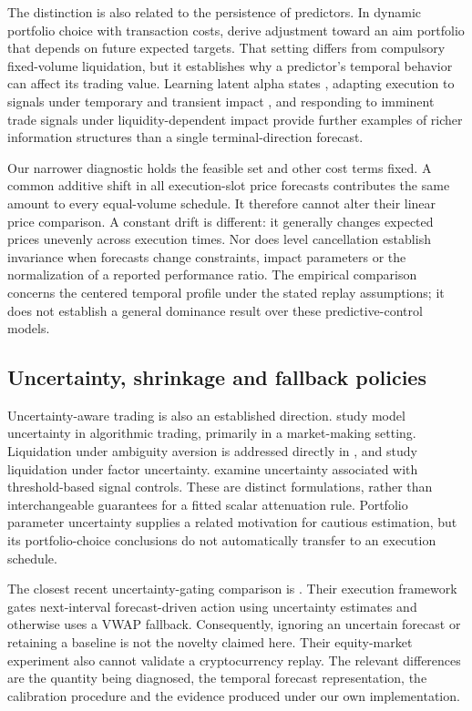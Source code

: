 The distinction is also related to the persistence of predictors. In dynamic portfolio choice with transaction costs, \citet{garleanu2013} derive adjustment toward an aim portfolio that depends on future expected targets. That setting differs from compulsory fixed-volume liquidation, but it establishes why a predictor's temporal behavior can affect its trading value. Learning latent alpha states \citep{casgrain2019}, adapting execution to signals under temporary and transient impact \citep{neuman2022}, and responding to imminent trade signals under liquidity-dependent impact \citep{bank2026} provide further examples of richer information structures than a single terminal-direction forecast.

Our narrower diagnostic holds the feasible set and other cost terms fixed. A common additive shift in all execution-slot price forecasts contributes the same amount to every equal-volume schedule. It therefore cannot alter their linear price comparison. A constant drift is different: it generally changes expected prices unevenly across execution times. Nor does level cancellation establish invariance when forecasts change constraints, impact parameters or the normalization of a reported performance ratio. The empirical comparison concerns the centered temporal profile under the stated replay assumptions; it does not establish a general dominance result over these predictive-control models.

\subsection{Uncertainty, shrinkage and fallback policies}

Uncertainty-aware trading is also an established direction. \citet{cartea2017} study model uncertainty in algorithmic trading, primarily in a market-making setting. Liquidation under ambiguity aversion is addressed directly in \citet{cartea_liquidation2017}, and \citet{horst2022} study liquidation under factor uncertainty. \citet{demarch2018} examine uncertainty associated with threshold-based signal controls. These are distinct formulations, rather than interchangeable guarantees for a fitted scalar attenuation rule. Portfolio parameter uncertainty \citep{kan2007} supplies a related motivation for cautious estimation, but its portfolio-choice conclusions do not automatically transfer to an execution schedule.

The closest recent uncertainty-gating comparison is \citet{irshad2026}. Their execution framework gates next-interval forecast-driven action using uncertainty estimates and otherwise uses a VWAP fallback. Consequently, ignoring an uncertain forecast or retaining a baseline is not the novelty claimed here. Their equity-market experiment also cannot validate a cryptocurrency replay. The relevant differences are the quantity being diagnosed, the temporal forecast representation, the calibration procedure and the evidence produced under our own implementation.

